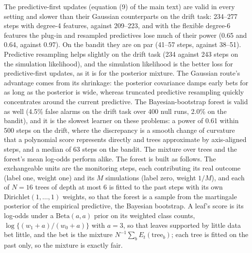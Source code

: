 \documentclass[11pt]{article}
\theoremstyle{remark}
\begin{document}
The predictive-first updates (equation (9) of the main text) are valid in every setting and
slower than their Gaussian counterparts on the drift task: 234--277 steps with
degree-4 features, against 209--223, and with the flexible degree-6 features the
plug-in and resampled predictives lose much of their power (0.65 and 0.64,
against 0.97). On the bandit they are on par (41--57 steps, against 38--51).
Predictive resampling helps slightly on the drift task (234 against 243 steps
on the simulation likelihood), and the simulation likelihood is the better
loss for predictive-first updates, as it is for the posterior mixture. The
Gaussian route's advantage comes from its shrinkage: the posterior covariance
damps early bets for as long as the posterior is wide, whereas truncated
predictive resampling quickly concentrates around the current predictive.
The Bayesian-bootstrap forest is valid as well (4.5\% false alarms on the drift
task over 400 null runs, 2.0\% on the bandit), and it is the slowest learner on
these problems: a power of 0.61 within 500 steps on the drift, where the
discrepancy is a smooth change of curvature that a polynomial score represents
directly and trees approximate by axis-aligned steps, and a median of 63 steps
on the bandit. The mixture over trees and the forest's mean log-odds perform
alike. The forest is built as follows. The exchangeable units are the
monitoring steps, each contributing its real outcome (label one, weight one)
and its $M$ simulations (label zero, weight $1/M$), and each of $N = 16$ trees
of depth at most 6 is fitted to the past steps with its own
$\mathrm{Dirichlet}(1, \ldots, 1)$ weights, so that the forest is a sample from
the martingale posterior of the empirical predictive, the Bayesian bootstrap.
A leaf's score is its log-odds under a $\mathrm{Beta}(a, a)$ prior on its
weighted class counts, $\log\{(w_1 + a)/(w_0 + a)\}$ with $a = 3$, so that
leaves supported by little data bet little, and the bet is the mixture
$N^{-1}\sum_b E_t(\mathrm{tree}_b)$; each tree is fitted on the past only, so
the mixture is exactly fair.
\end{document}
